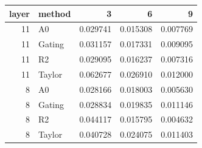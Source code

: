 \begin{tabular}{rlrrr}
\toprule
layer & method & 3 & 6 & 9 \\
\midrule
11 & A0 & 0.029741 & 0.015308 & 0.007769 \\
11 & Gating & 0.031157 & 0.017331 & 0.009095 \\
11 & R2 & 0.029095 & 0.016237 & 0.007316 \\
11 & Taylor & 0.062677 & 0.026910 & 0.012000 \\
8 & A0 & 0.028166 & 0.018003 & 0.005630 \\
8 & Gating & 0.028834 & 0.019835 & 0.011146 \\
8 & R2 & 0.044117 & 0.015795 & 0.004632 \\
8 & Taylor & 0.040728 & 0.024075 & 0.011403 \\
\bottomrule
\end{tabular}
